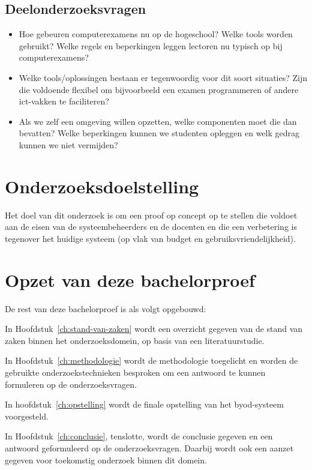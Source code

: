 \subsection{Deelonderzoeksvragen}
\begin{itemize}
	 \item Hoe gebeuren computerexamens nu op de hogeschool? Welke tools worden gebruikt? Welke regels en beperkingen leggen lectoren nu typisch op bij computerexamens?
	
	\item Welke tools/oplossingen bestaan er tegenwoordig voor dit soort situaties? Zijn die voldoende flexibel om bijvoorbeeld een examen programmeren of andere ict-vakken te faciliteren?
	
	\item Als we zelf een omgeving willen opzetten, welke componenten moet die dan bevatten? Welke beperkingen kunnen we studenten opleggen en welk gedrag kunnen we niet vermijden?

\end{itemize} 

\section{Onderzoeksdoelstelling}
\label{sec:onderzoeksdoelstelling}

Het doel van dit onderzoek is om een proof op concept op te stellen die voldoet aan de eisen van de systeembeheerders en de docenten en die een verbetering is tegenover het huidige systeem (op vlak van budget en gebruiksvriendelijkheid). 

\section{Opzet van deze bachelorproef}
\label{sec:opzet-bachelorproef}


De rest van deze bachelorproef is als volgt opgebouwd:

In Hoofdstuk~\ref{ch:stand-van-zaken} wordt een overzicht gegeven van de stand van zaken binnen het onderzoeksdomein, op basis van een literatuurstudie.

In Hoofdstuk~\ref{ch:methodologie} wordt de methodologie toegelicht en worden de gebruikte onderzoekstechnieken besproken om een antwoord te kunnen formuleren op de onderzoeksvragen.

In hoofdstuk~\ref{ch:opstelling} wordt de finale opstelling van het byod-systeem voorgesteld.  

In Hoofdstuk~\ref{ch:conclusie}, tenslotte, wordt de conclusie gegeven en een antwoord geformuleerd op de onderzoeksvragen. Daarbij wordt ook een aanzet gegeven voor toekomstig onderzoek binnen dit domein.


